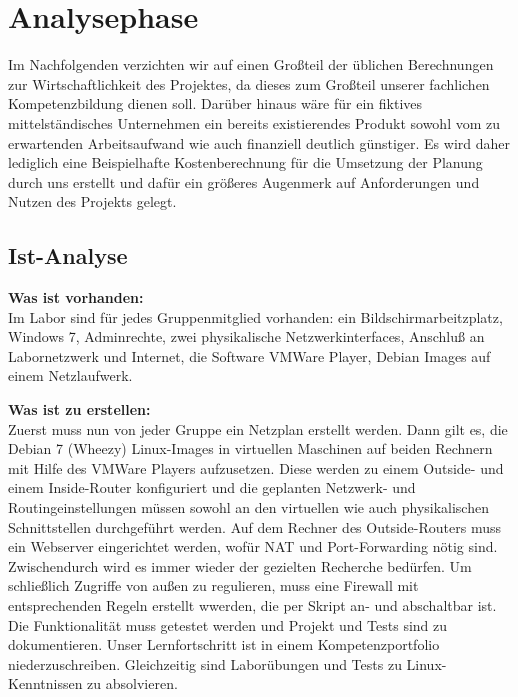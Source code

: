 \section{Analysephase} 
\label{sec:Analysephase}

Im Nachfolgenden verzichten wir auf einen Großteil der üblichen Berechnungen zur Wirtschaftlichkeit des Projektes, da dieses zum Großteil unserer fachlichen Kompetenzbildung dienen soll. Darüber hinaus wäre für ein fiktives mittelständisches Unternehmen ein bereits existierendes Produkt sowohl vom zu erwartenden Arbeitsaufwand wie auch finanziell deutlich günstiger. Es wird daher lediglich eine Beispielhafte Kostenberechnung für die Umsetzung der Planung durch uns erstellt und dafür ein größeres Augenmerk auf Anforderungen und Nutzen des Projekts gelegt. 

\subsection{Ist-Analyse} 
\label{sec:IstAnalyse}

    \textbf{Was ist vorhanden:}\\
    Im Labor sind für jedes Gruppenmitglied vorhanden: ein Bildschirmarbeitzplatz, Windows 7, Adminrechte, zwei physikalische Netzwerkinterfaces, Anschluß an Labornetzwerk und Internet, die Software VMWare Player, Debian Images auf einem Netzlaufwerk.
    
    \textbf{Was ist zu erstellen:}\\
    Zuerst muss nun von jeder Gruppe ein Netzplan erstellt werden. Dann gilt es, die Debian 7 (Wheezy) Linux-Images in virtuellen Maschinen auf beiden Rechnern mit Hilfe des VMWare Players aufzusetzen. Diese werden zu einem Outside- und einem Inside-Router konfiguriert und die geplanten Netzwerk- und Routingeinstellungen müssen sowohl an den virtuellen wie auch physikalischen Schnittstellen durchgeführt werden. Auf dem Rechner des Outside-Routers muss ein Webserver eingerichtet werden, wofür NAT und Port-Forwarding nötig sind. Zwischendurch wird es immer wieder der gezielten Recherche bedürfen. Um schließlich Zugriffe von außen zu regulieren, muss eine Firewall mit entsprechenden Regeln erstellt wwerden, die per Skript an- und abschaltbar ist. Die Funktionalität muss getestet werden und Projekt und Tests sind zu dokumentieren. Unser Lernfortschritt ist in einem Kompetenzportfolio niederzuschreiben. Gleichzeitig sind Laborübungen und Tests zu Linux-Kenntnissen zu absolvieren.


